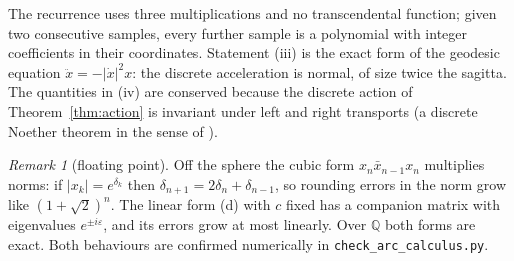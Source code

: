 \documentclass[11pt,reqno]{amsart}
\theoremstyle{definition}
\theoremstyle{remark}
\newtheorem{remark}[theorem]{Remark}
\numberwithin{equation}{section}
\newcommand{\Q}{\mathbb{Q}}
\begin{document}
The recurrence uses three multiplications and no transcendental function; given two consecutive samples,
every further sample is a polynomial with integer coefficients in their coordinates.  Statement (iii) is the
exact form of the geodesic equation $\ddot x=-\lvert\dot x\rvert^2x$: the discrete acceleration is normal,
of size twice the sagitta.  The quantities in (iv) are conserved because the discrete action of Theorem~\ref{thm:action} is invariant under left and right
transports (a discrete Noether theorem in the sense of \cite{MW}).

\begin{remark}[floating point]
Off the sphere the cubic form $x_n\bar x_{n-1}x_n$ multiplies norms: if $\lvert x_k\rvert=e^{\delta_k}$ then
$\delta_{n+1}=2\delta_n+\delta_{n-1}$, so rounding errors in the norm grow like $(1+\sqrt2)^n$.  The linear
form (d) with $c$ fixed has a companion matrix with eigenvalues $e^{\pm i\varepsilon}$, and its errors grow at
most linearly.  Over $\Q$ both forms are exact.  Both behaviours are confirmed numerically in
\texttt{check\_arc\_calculus.py}.
\end{remark}
\end{document}
